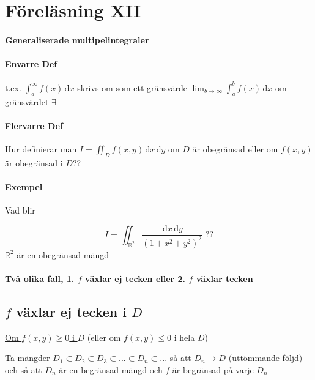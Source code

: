 \documentclass[a4paper]{article}
\newcommand{\de}[1]{\,\mathrm{d}#1}
\begin{document}
\newpage
\section{Föreläsning XII}

\paragraph{Generaliserade multipelintegraler}

\paragraph{Envarre Def}
t.ex. $\int_a^\infty f(x) \de{x}$ skrivs om som ett gränsvärde $\lim_{b\rightarrow\infty}\int_a^bf(x)\de{x}$ om gränsvärdet $\exists$

\paragraph{Flervarre Def}
Hur definierar man $I = \iint_D f(x,y) \de{x}\de{y}$ om $D$ är obegränsad eller om $f(x,y)$ är obegränsad i $D$??

\paragraph{Exempel}
Vad blir

\begin{equation}\label{eq:12.1}
	I = \iint_{\mathbb{R}^2} \frac{\de{x}\de{y}}{(1+x^2+y^2)^2} \text{ ??}
\end{equation}
$\mathbb{R}^2$ är en obegränsad mängd


\paragraph{Två olika fall, 1. \texorpdfstring{$f$}{f} växlar ej tecken eller 2. \texorpdfstring{$f$}{f} växlar tecken}

\subsection{\texorpdfstring{$f$}{f} växlar ej tecken i \texorpdfstring{$D$}{D}} \label{subsec:nonchanging}
\item \underline{Om $f(x,y) \geq 0$ i $D$} (eller om $f(x,y) \leq 0 $ i hela $D$) \newline

Ta mängder $D_1 \subset D_2 \subset D_3 \subset ... \subset D_n \subset ...$ så att $D_n \rightarrow D$ (uttömmande följd)
och så att $D_n$ är en begränsad mängd och $f$ är begränsad på varje $D_n$ \newline
\end{document}
